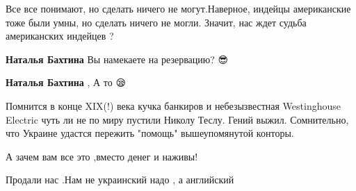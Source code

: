 \begin{itemize}
Все все понимают, но сделать ничего не могут.Наверное, индейцы американские
тоже были умны, но сделать ничего не могли. Значит, нас ждет судьба
американских индейцев ?

\begin{itemize}
 
\textbf{Наталья Бахтина}
Вы намекаете на резервацию? 😎

 
\textbf{Наталья Бахтина} , А то 😪
\end{itemize}

 

Помнится в конце XIX(!) века кучка банкиров и небезызвестная Westinghouse
Electric чуть ли не по миру пустили Николу Теслу. Гений выжил. Сомнительно, что
Украине удастся пережить "помощь" вышеупомянутой конторы.


 
А зачем вам все это ,вместо денег и наживы!

 
Продали нас .Нам не украинский надо , а английский

 

\end{itemize}

